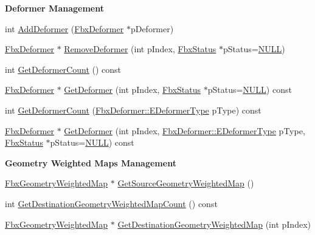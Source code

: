\begin{Indent}\textbf{ Deformer Management}\par
\begin{DoxyCompactItemize}
\item 
int \hyperlink{class_fbx_geometry_a2f7e48a2faaf3893bc28eb8b684da908}{Add\+Deformer} (\hyperlink{class_fbx_deformer}{Fbx\+Deformer} $\ast$p\+Deformer)
\item 
\hyperlink{class_fbx_deformer}{Fbx\+Deformer} $\ast$ \hyperlink{class_fbx_geometry_a49e920f4c7a2179ef3297e7c5f2cf31a}{Remove\+Deformer} (int p\+Index, \hyperlink{class_fbx_status}{Fbx\+Status} $\ast$p\+Status=\hyperlink{fbxarch_8h_a070d2ce7b6bb7e5c05602aa8c308d0c4}{N\+U\+LL})
\item 
int \hyperlink{class_fbx_geometry_a8cca6f160b52ee1ffd799c599c36f784}{Get\+Deformer\+Count} () const
\item 
\hyperlink{class_fbx_deformer}{Fbx\+Deformer} $\ast$ \hyperlink{class_fbx_geometry_a3a6bd565c4a5a3a8b5daa3b653cc8a0a}{Get\+Deformer} (int p\+Index, \hyperlink{class_fbx_status}{Fbx\+Status} $\ast$p\+Status=\hyperlink{fbxarch_8h_a070d2ce7b6bb7e5c05602aa8c308d0c4}{N\+U\+LL}) const
\item 
int \hyperlink{class_fbx_geometry_a3eaf9796d935cd523d0a85a7f0c018fc}{Get\+Deformer\+Count} (\hyperlink{class_fbx_deformer_a07e2cfb767191ba5c8799fdfbfe3eaf6}{Fbx\+Deformer\+::\+E\+Deformer\+Type} p\+Type) const
\item 
\hyperlink{class_fbx_deformer}{Fbx\+Deformer} $\ast$ \hyperlink{class_fbx_geometry_aa283c85cdc0c5c3d2eae56952b6a41a0}{Get\+Deformer} (int p\+Index, \hyperlink{class_fbx_deformer_a07e2cfb767191ba5c8799fdfbfe3eaf6}{Fbx\+Deformer\+::\+E\+Deformer\+Type} p\+Type, \hyperlink{class_fbx_status}{Fbx\+Status} $\ast$p\+Status=\hyperlink{fbxarch_8h_a070d2ce7b6bb7e5c05602aa8c308d0c4}{N\+U\+LL}) const
\end{DoxyCompactItemize}
\end{Indent}
\begin{Indent}\textbf{ Geometry Weighted Maps Management}\par
\begin{DoxyCompactItemize}
\item 
\hyperlink{class_fbx_geometry_weighted_map}{Fbx\+Geometry\+Weighted\+Map} $\ast$ \hyperlink{class_fbx_geometry_a2d8cd2e9bf5a91fedcc1039dc4dce31d}{Get\+Source\+Geometry\+Weighted\+Map} ()
\item 
int \hyperlink{class_fbx_geometry_a7bebc9194083c5bacf77389b98ff906f}{Get\+Destination\+Geometry\+Weighted\+Map\+Count} () const
\item 
\hyperlink{class_fbx_geometry_weighted_map}{Fbx\+Geometry\+Weighted\+Map} $\ast$ \hyperlink{class_fbx_geometry_a377769a99e12dc765ac9ea49282ad1bf}{Get\+Destination\+Geometry\+Weighted\+Map} (int p\+Index)
\end{DoxyCompactItemize}
\end{Indent}
